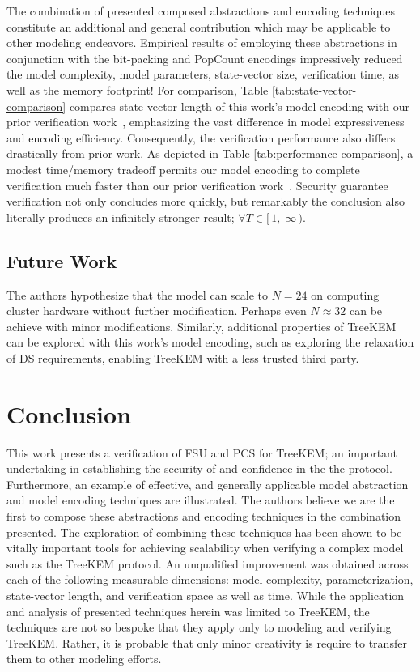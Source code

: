 \documentclass[runningheads]{llncs}
\newcommand{\Abrev}[1]{\gls{#1}}
\newcommand{\NumericRangeOpenR}[2]{\ensuremath{[\,#1,\; #2\,)}\xspace}
\begin{document}
The combination of presented composed abstractions and encoding techniques constitute an additional and general contribution which may be applicable to other modeling endeavors.
Empirical results of employing these abstractions in conjunction with the bit-packing and PopCount encodings impressively reduced the model complexity, model parameters, state-vector size, verification time, as well as the memory footprint!
For comparison, Table \ref{tab:state-vector-comparison} compares state-vector length of this work's model encoding with our prior verification work~\cite{washburn2022formal}, emphasizing the vast difference in model expressiveness and encoding efficiency.
Consequently, the verification performance also differs drastically from prior work.
As depicted in Table \ref{tab:performance-comparison}, a modest time/memory tradeoff permits our model encoding to complete verification much faster than our prior verification work~\cite{washburn2022formal}.
Security guarantee verification not only concludes more quickly, but remarkably the conclusion also literally produces an infinitely stronger result; $\forall T \in \NumericRangeOpenR{1}{\infty}$.

\subsection{Future Work}

The authors hypothesize that the model can scale to $N = 24$ on computing cluster hardware without further modification.
Perhaps even $N \approx 32$ can be achieve with minor modifications.
Similarly, additional properties of TreeKEM can be explored with this work's model encoding, such as exploring the relaxation of  \Abrev{DS} requirements, enabling TreeKEM with a less trusted third party.
 
\section{Conclusion}

This work presents a verification of \Abrev{FSU} and \Abrev{PCS} for TreeKEM; an important undertaking in establishing the security of and confidence in the the protocol.
Furthermore, an example of effective, and generally applicable model abstraction and model encoding techniques are illustrated.
The authors believe we are the first to compose these abstractions and encoding techniques in the combination presented.
The exploration of combining these techniques has been shown to be vitally important tools for achieving scalability when verifying a complex model such as the TreeKEM protocol.
An unqualified improvement was obtained across each of the following measurable dimensions: model complexity,  parameterization, state-vector length, and verification space as well as time.
While the application and analysis of presented techniques herein was limited to TreeKEM, the techniques are not so bespoke that they apply only to modeling and verifying TreeKEM.
Rather, it is probable that only minor creativity is require to transfer them to other modeling efforts.
\end{document}
